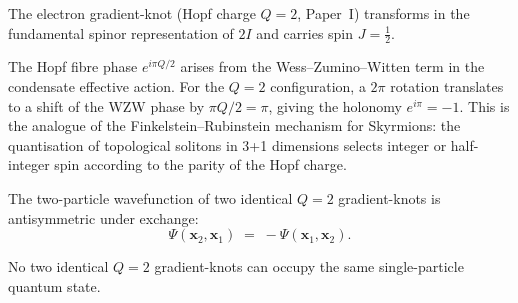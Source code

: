 

\begin{theorem}[Spin-$\tfrac{1}{2}$ of the $Q=2$ gradient-knot]
\label{P13:thm:spin_half}
The electron gradient-knot (Hopf charge $Q=2$, Paper~I) transforms
in the fundamental spinor representation of $2I$ and carries spin $J=\tfrac{1}{2}$.
\end{theorem}

\begin{remark}
\label{P13:rem:hopf_phase}
The Hopf fibre phase $e^{i\pi Q/2}$ arises from the Wess--Zumino--Witten
term in the condensate effective action.
For the $Q=2$ configuration, a $2\pi$ rotation translates to a shift
of the WZW phase by $\pi Q/2 = \pi$, giving the holonomy $e^{i\pi}=-1$.
This is the analogue of the Finkelstein--Rubinstein mechanism for Skyrmions:
the quantisation of topological solitons in 3+1 dimensions selects
integer or half-integer spin according to the parity of the Hopf charge.
\end{remark}

\begin{corollary}
\label{P13:cor:fermi_stats}
The two-particle wavefunction of two identical $Q=2$ gradient-knots is
antisymmetric under exchange:
\begin{equation}
  \boxed{\Psi(\mathbf{x}_2,\mathbf{x}_1) \;=\; -\Psi(\mathbf{x}_1,\mathbf{x}_2).}
  \label{P13:eq:antisymmetry}
\end{equation}
\end{corollary}

\begin{corollary}
\label{P13:cor:pauli_exclusion}
No two identical $Q=2$ gradient-knots can occupy the same single-particle
quantum state.
\end{corollary}

